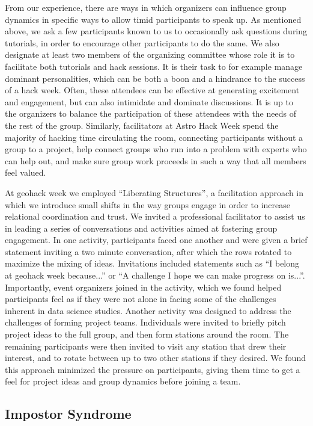 \documentclass{aastex62}
\begin{document}
From our experience, there are ways in which organizers can influence group dynamics in specific ways to allow timid participants to speak up. As mentioned above, we ask a few participants known to us to occasionally ask questions during tutorials, in order to encourage other participants to do the same. We also designate at least two members of the organizing committee whose role it is to facilitate both tutorials and hack sessions. It is their task to for example manage dominant personalities, which can be both a boon and a hindrance to the success of a hack week. Often, these attendees can be effective at generating excitement and engagement, but can also intimidate and dominate discussions. It is up to the organizers to balance the participation of these attendees with the needs of the rest of the group. Similarly, facilitators at Astro Hack Week spend the majority of hacking time circulating the room, connecting participants without a group to a project, help connect groups who run into a problem with experts who can help out, and make sure group work proceeds in such a way that all members feel valued.

At geohack week we employed ``Liberating Structures'', a facilitation approach in which we introduce small shifts in the way groups engage in order to increase relational coordination and trust. We invited a professional facilitator to assist us in leading a series of conversations and activities aimed at fostering group engagement. In one activity, participants faced one another and were given a brief statement inviting a two minute conversation, after which the rows rotated to maximize the mixing of ideas. Invitations included statements such as ``I belong at geohack week because...'' or ``A challenge I hope we can make progress on is...''. Importantly, event organizers joined in the activity, which we found helped participants feel as if they were not alone in facing some of the challenges inherent in data science studies. Another activity was designed to address the challenges of forming project teams. Individuals were invited to briefly pitch project ideas to the full group, and then form stations around the room. The remaining participants were then invited to visit any station that drew their interest, and to rotate between up to two other stations if they desired. We found this approach minimized the pressure on participants, giving them time to get a feel for project ideas and group dynamics before joining a team. 


\subsection{Impostor Syndrome}
\end{document}
